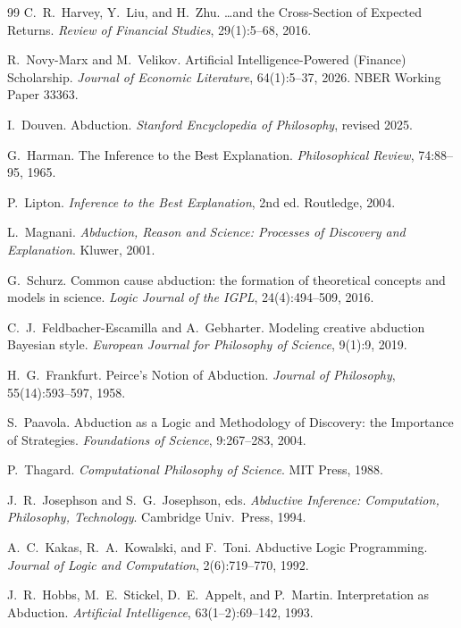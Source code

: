 \documentclass[11pt]{article}
\begin{document}
\begin{thebibliography}{99}
 C.~R.~Harvey, Y.~Liu, and H.~Zhu.
\newblock \ldots and the Cross-Section of Expected Returns.
\newblock \emph{Review of Financial Studies}, 29(1):5--68, 2016.

 R.~Novy-Marx and M.~Velikov.
\newblock Artificial Intelligence-Powered (Finance) Scholarship.
\newblock \emph{Journal of Economic Literature}, 64(1):5--37, 2026. NBER Working Paper 33363.

 I.~Douven.
\newblock Abduction.
\newblock \emph{Stanford Encyclopedia of Philosophy}, revised 2025.

 G.~Harman.
\newblock The Inference to the Best Explanation.
\newblock \emph{Philosophical Review}, 74:88--95, 1965.

 P.~Lipton.
\newblock \emph{Inference to the Best Explanation}, 2nd ed. Routledge, 2004.

 L.~Magnani.
\newblock \emph{Abduction, Reason and Science: Processes of Discovery and Explanation}. Kluwer, 2001.

 G.~Schurz.
\newblock Common cause abduction: the formation of theoretical concepts and models in science.
\newblock \emph{Logic Journal of the IGPL}, 24(4):494--509, 2016.

 C.~J.~Feldbacher-Escamilla and A.~Gebharter.
\newblock Modeling creative abduction Bayesian style.
\newblock \emph{European Journal for Philosophy of Science}, 9(1):9, 2019.

 H.~G.~Frankfurt.
\newblock Peirce's Notion of Abduction.
\newblock \emph{Journal of Philosophy}, 55(14):593--597, 1958.

 S.~Paavola.
\newblock Abduction as a Logic and Methodology of Discovery: the Importance of Strategies.
\newblock \emph{Foundations of Science}, 9:267--283, 2004.

 P.~Thagard.
\newblock \emph{Computational Philosophy of Science}. MIT Press, 1988.

 J.~R.~Josephson and S.~G.~Josephson, eds.
\newblock \emph{Abductive Inference: Computation, Philosophy, Technology}. Cambridge Univ.\ Press, 1994.

 A.~C.~Kakas, R.~A.~Kowalski, and F.~Toni.
\newblock Abductive Logic Programming.
\newblock \emph{Journal of Logic and Computation}, 2(6):719--770, 1992.

 J.~R.~Hobbs, M.~E.~Stickel, D.~E.~Appelt, and P.~Martin.
\newblock Interpretation as Abduction.
\newblock \emph{Artificial Intelligence}, 63(1--2):69--142, 1993.


\end{thebibliography}
\end{document}
